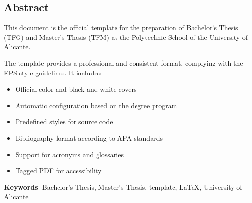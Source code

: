 \begin{otherlanguage}{english}
\chapter*{Abstract}

This document is the official template for the preparation of Bachelor's Thesis (TFG) and Master's Thesis (TFM) at the Polytechnic School of the University of Alicante.

The template provides a professional and consistent format, complying with the EPS style guidelines. It includes:

\begin{itemize}
  \item Official color and black-and-white covers
  \item Automatic configuration based on the degree program
  \item Predefined styles for source code
  \item Bibliography format according to APA standards
  \item Support for acronyms and glossaries
  \item Tagged PDF for accessibility
\end{itemize}

\textbf{Keywords:} Bachelor's Thesis, Master's Thesis, template, LaTeX, University of Alicante

\end{otherlanguage}

\cleardoublepage

